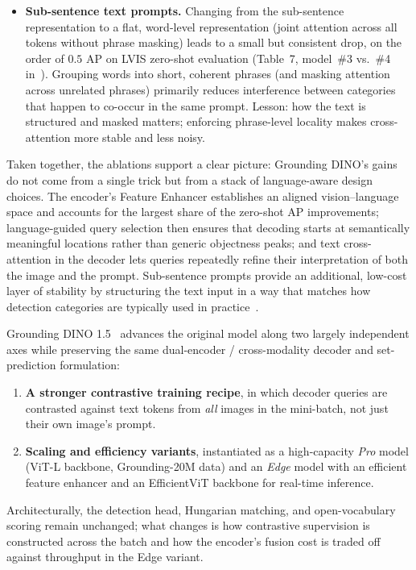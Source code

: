 \begin{enrichment}
\begin{enrichment}
\begin{itemize}
			\item \textbf{Sub-sentence text prompts.}  
			Changing from the sub-sentence representation to a flat, word-level representation (joint attention across all tokens without phrase masking) leads to a small but consistent drop, on the order of \(0.5\) AP on LVIS zero-shot evaluation (Table~7, model~\#3 vs.\ \#4 in~\cite{liu2023_groundingdino}). Grouping words into short, coherent phrases (and masking attention across unrelated phrases) primarily reduces interference between categories that happen to co-occur in the same prompt. Lesson: how the text is structured and masked matters; enforcing phrase-level locality makes cross-attention more stable and less noisy.
		\end{itemize}
		
		Taken together, the ablations support a clear picture: Grounding DINO’s gains do not come from a single trick but from a stack of language-aware design choices. The encoder’s Feature Enhancer establishes an aligned vision--language space and accounts for the largest share of the zero-shot AP improvements; language-guided query selection then ensures that decoding starts at semantically meaningful locations rather than generic objectness peaks; and text cross-attention in the decoder lets queries repeatedly refine their interpretation of both the image and the prompt. Sub-sentence prompts provide an additional, low-cost layer of stability by structuring the text input in a way that matches how detection categories are typically used in practice~\cite{liu2023_groundingdino}.
		
	\end{enrichment}
	
	\begin{enrichment}
		\label{enr:chapter14_groundingdino_onepointfive}
		
		Grounding DINO 1.5~\cite{ren2024_groundingdino15} advances the original model along two largely independent axes while preserving the same dual-encoder / cross-modality decoder and set-prediction formulation:
		\begin{enumerate}
			\item \textbf{A stronger contrastive training recipe}, in which decoder queries are contrasted against text tokens from \emph{all} images in the mini-batch, not just their own image’s prompt.
			\item \textbf{Scaling and efficiency variants}, instantiated as a high-capacity \emph{Pro} model (ViT-L backbone, Grounding-20M data) and an \emph{Edge} model with an efficient feature enhancer and an EfficientViT backbone for real-time inference.
		\end{enumerate}
		Architecturally, the detection head, Hungarian matching, and open-vocabulary scoring remain unchanged; what changes is how contrastive supervision is constructed across the batch and how the encoder’s fusion cost is traded off against throughput in the Edge variant.
		

\end{enrichment}
\end{enrichment}
